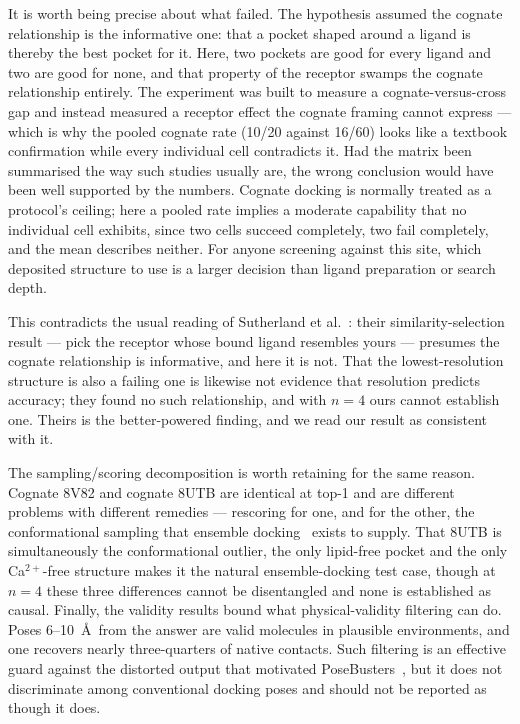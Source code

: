 \documentclass[sigconf]{acmart}
\begin{document}
It is worth being precise about what failed. The hypothesis assumed the cognate
relationship is the informative one: that a pocket shaped around a ligand is
thereby the best pocket for it. Here, two pockets are good for every ligand and
two are good for none, and that property of the receptor swamps the cognate
relationship entirely. The experiment was built to measure a cognate-versus-cross
gap and instead measured a receptor effect the cognate framing cannot express ---
which is why the pooled cognate rate (10/20 against 16/60) looks like a textbook
confirmation while every individual cell contradicts it. Had the matrix been
summarised the way such studies usually are, the wrong conclusion would have been
well supported by the numbers. Cognate docking is normally treated as a protocol's
ceiling; here a pooled rate implies a moderate capability that no individual cell
exhibits, since two cells succeed completely, two fail completely, and the mean
describes neither. For anyone screening against this site, which deposited
structure to use is a larger decision than ligand preparation or search depth.

This contradicts the usual reading of Sutherland et al.~\cite{sutherland2007}:
their similarity-selection result --- pick the receptor whose bound ligand
resembles yours --- presumes the cognate relationship is informative, and here it
is not. That the lowest-resolution structure is also a failing one is likewise not
evidence that resolution predicts accuracy; they found no such relationship, and
with $n = 4$ ours cannot establish one. Theirs is the better-powered finding, and
we read our result as consistent with it.

The sampling/scoring decomposition is worth retaining for the same reason. Cognate
8V82 and cognate 8UTB are identical at top-1 and are different problems with
different remedies --- rescoring for one, and for the other, the conformational
sampling that ensemble docking~\cite{amaro2018} exists to supply. That 8UTB is
simultaneously the conformational outlier, the only lipid-free pocket and the only
Ca$^{2+}$-free structure makes it the natural ensemble-docking test case, though
at $n = 4$ these three differences cannot be disentangled and none is established
as causal. Finally, the validity results bound what physical-validity filtering
can do. Poses 6--10~\AA\ from the answer are valid molecules in plausible
environments, and one recovers nearly three-quarters of native contacts. Such
filtering is an effective guard against the distorted output that motivated
PoseBusters~\cite{buttenschoen2024}, but it does not discriminate among
conventional docking poses and should not be reported as though it does.
\end{document}
